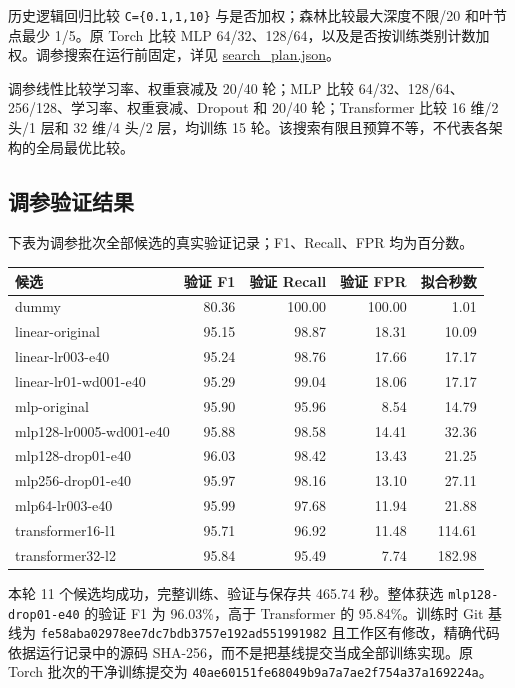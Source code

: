 \documentclass[UTF8,a4paper,11pt,fontset=fandol]{ctexart}
\newcounter{none}
\begin{document}
历史逻辑回归比较 \texttt{C=\{0.1,1,10\}}
与是否加权；森林比较最大深度不限/20 和叶节点最少 1/5。原 Torch 比较 MLP
64/32、128/64，以及是否按训练类别计数加权。调参搜索在运行前固定，详见
\href{https://github.com/ZureTz/ml-network-intrusion-detection/blob/master/reports/results/torch-tune-20261105/training/search_plan.json}{search\_plan.json}。

调参线性比较学习率、权重衰减及 20/40 轮；MLP 比较
64/32、128/64、256/128、学习率、权重衰减、Dropout 和 20/40
轮；Transformer 比较 16 维/2 头/1 层和 32 维/4 头/2 层，均训练 15
轮。该搜索有限且预算不等，不代表各架构的全局最优比较。

\subsection{调参验证结果}\label{ux8c03ux53c2ux9a8cux8bc1ux7ed3ux679c}

下表为调参批次全部候选的真实验证记录；F1、Recall、FPR 均为百分数。


{\def\LTcaptype{none} %
\begin{longtable}[]{@{}lrrrr@{}}
\toprule\noalign{}
候选 & 验证 F1 & 验证 Recall & 验证 FPR & 拟合秒数 \\
\midrule\noalign{}
\endhead
\bottomrule\noalign{}
\endlastfoot
dummy & 80.36 & 100.00 & 100.00 & 1.01 \\
linear-original & 95.15 & 98.87 & 18.31 & 10.09 \\
linear-lr003-e40 & 95.24 & 98.76 & 17.66 & 17.17 \\
linear-lr01-wd001-e40 & 95.29 & 99.04 & 18.06 & 17.17 \\
mlp-original & 95.90 & 95.96 & 8.54 & 14.79 \\
mlp128-lr0005-wd001-e40 & 95.88 & 98.58 & 14.41 & 32.36 \\
mlp128-drop01-e40 & 96.03 & 98.42 & 13.43 & 21.25 \\
mlp256-drop01-e40 & 95.97 & 98.16 & 13.10 & 27.11 \\
mlp64-lr003-e40 & 95.99 & 97.68 & 11.94 & 21.88 \\
transformer16-l1 & 95.71 & 96.92 & 11.48 & 114.61 \\
transformer32-l2 & 95.84 & 95.49 & 7.74 & 182.98 \\
\end{longtable}
}

本轮 11 个候选均成功，完整训练、验证与保存共 465.74 秒。整体获选
\texttt{mlp128-drop01-e40} 的验证 F1 为 96.03\%，高于 Transformer 的
95.84\%。训练时 Git 基线为
\nolinkurl{fe58aba02978ee7dc7bdb3757e192ad551991982}
且工作区有修改，精确代码依据运行记录中的源码
SHA-256，而不是把基线提交当成全部训练实现。原 Torch 批次的干净训练提交为
\nolinkurl{40ae60151fe68049b9a7a7ae2f754a37a169224a}。
\end{document}

